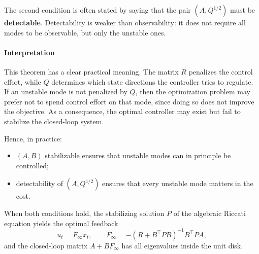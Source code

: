 The second condition is often stated by saying that the pair
\((A,Q^{1/2})\) must be \textbf{detectable}.  
Detectability is weaker than observability: it does not require all modes
to be observable, but only the unstable ones.

\paragraph{Interpretation}

This theorem has a clear practical meaning.  
The matrix \(R\) penalizes the control effort, while \(Q\) determines which
state directions the controller tries to regulate. If an unstable mode is
not penalized by \(Q\), then the optimization problem may prefer not to
spend control effort on that mode, since doing so does not improve the
objective. As a consequence, the optimal controller may exist but fail to
stabilize the closed-loop system.

Hence, in practice:

\begin{itemize}
    \item \((A,B)\) stabilizable ensures that unstable modes can in principle
    be controlled;
    \item detectability of \((A,Q^{1/2})\) ensures that every unstable mode
    matters in the cost.
\end{itemize}

When both conditions hold, the stabilizing solution \(P\) of the algebraic
Riccati equation yields the optimal feedback
\[
u_t = F_\infty x_t,
\qquad
F_\infty = - (R + B^\top P B)^{-1} B^\top P A,
\]
and the closed-loop matrix \(A + B F_\infty\) has all eigenvalues inside
the unit disk.